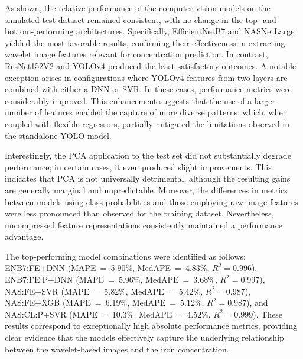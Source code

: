 \documentclass[10pt]{iopart}
\begin{document}
As shown, the relative performance of the computer vision models on the simulated test dataset remained consistent,
with no change in the top- and bottom-performing architectures.
Specifically, EfficientNetB7 and NASNetLarge yielded the most favorable results,
confirming their effectiveness in extracting wavelet image features relevant for concentration prediction.
In contrast, ResNet152V2 and YOLOv4 produced the least satisfactory outcomes.
A notable exception arises in configurations where YOLOv4 features from two layers are combined with either a DNN or SVR.
In these cases, performance metrics were considerably improved.
This enhancement suggests that the use of a larger number of features enabled the capture of more diverse patterns,
which, when coupled with flexible regressors, partially mitigated the limitations observed in the standalone YOLO model.

Interestingly, the PCA application to the test set did not substantially degrade performance;
in certain cases, it even produced slight improvements.
This indicates that PCA is not universally detrimental, although the resulting gains are generally marginal and unpredictable.
Moreover, the differences in metrics between models using class probabilities and those employing raw image features
were less pronounced than observed for the training dataset.
Nevertheless, uncompressed feature representations consistently maintained a performance advantage.

The top-performing model combinations were identified as follows:
ENB7:FE+DNN (MAPE~=~5.90\%,
MedAPE~=~4.83\%,
$R^2= 0.996$),
ENB7:FE:P+DNN
(MAPE~=~5.96\%,
MedAPE~=~3.68\%,
$R^2 = 0.997$),
NAS:FE+SVR
(MAPE~=~5.82\%,
MedAPE~=~5.42\%,
$R^2 = 0.987$),
NAS:FE+XGB
(MAPE~=~6.19\%,
MedAPE~=~5.12\%,
$R^2 = 0.987$),
and NAS:CL:P+SVR
(MAPE~=~10.3\%,
MedAPE~=~4.52\%,
$R^2 = 0.999$).
These results correspond to exceptionally high absolute performance metrics,
providing clear evidence that the models effectively capture
the underlying relationship between the wavelet-based images and the iron concentration.
\end{document}
